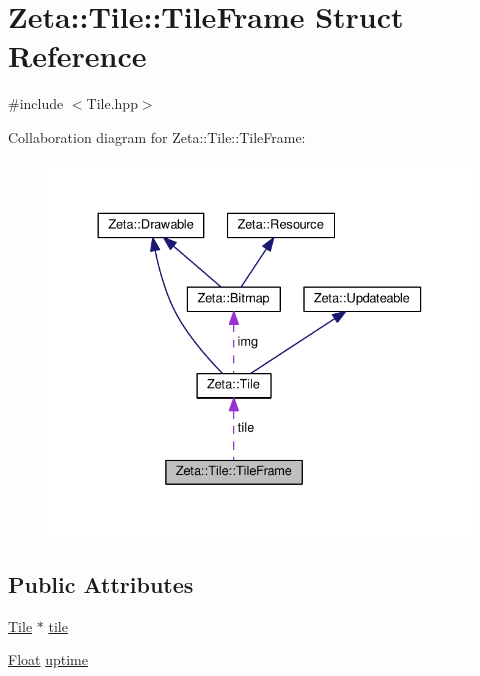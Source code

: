 \hypertarget{structZeta_1_1Tile_1_1TileFrame}{\section{Zeta\+:\+:Tile\+:\+:Tile\+Frame Struct Reference}
\label{structZeta_1_1Tile_1_1TileFrame}
}


{\ttfamily \#include $<$Tile.\+hpp$>$}



Collaboration diagram for Zeta\+:\+:Tile\+:\+:Tile\+Frame\+:\nopagebreak
\begin{figure}[H]
\begin{center}
\leavevmode
\includegraphics[width=333pt]{structZeta_1_1Tile_1_1TileFrame__coll__graph}
\end{center}
\end{figure}
\subsection*{Public Attributes}
\begin{DoxyCompactItemize}
\item 
\hyperlink{classZeta_1_1Tile}{Tile} $\ast$ \hyperlink{structZeta_1_1Tile_1_1TileFrame_a1abbf5d54b4c227d1d3c72595987e814}{tile}
\item 
\hyperlink{namespaceZeta_a1e0a1265f9b3bd3075fb0fabd39088ba}{Float} \hyperlink{structZeta_1_1Tile_1_1TileFrame_a8238c284c81423ea18c6b40d46522704}{uptime}
\end{DoxyCompactItemize}


